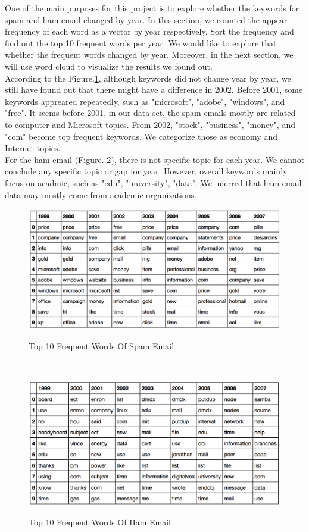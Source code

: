 
One of the main purposes for this project is to explore whether the keywords for spam and ham email changed by year. In this section, we counted the appear frequency of each word as a vector by year respectively. Sort the frequency and find out the top 10 frequent words per year. We would like to explore that whether the frequent words changed by year. Moreover, in the next section, we will use word cloud to visualize the results we found out.\\

According to the Figure.\ref{topwordspam}, although keywords did not change year by year, we still have found out that there might have a difference in 2002. Before 2001, some keywords appreared repeatedly, such as "microsoft", "adobe", "windows", and "free". It seems before 2001, in our data set, the spam emails mostly are related to computer and Microsoft topics. From 2002, "stock", "business", "money", and  "com" become top frequent keywords. We categorize those as economy and Internet topics. \\

For the ham email (Figure. \ref{topwordham}), there is not specific topic for each year. We cannot conclude any specific topic or gap for year. However, overall keywords mainly focus on acadmic, such as "edu", "university", "data". We inferred that ham email data may mostly come from academic organizations.\\

\begin{figure}[ht!]
    \centering
    \includegraphics[width=13cm]{top_word_spam.png}\\
    \caption{Top 10 Frequent Words Of Spam Email}
    \label{topwordspam}
\end{figure}\\


\begin{figure}[ht!]
    \centering
    \includegraphics[width=13cm]{top_word_ham.png}\\
    \caption{Top 10 Frequent Words Of Ham Email}
    \label{topwordham}
\end{figure}\\


